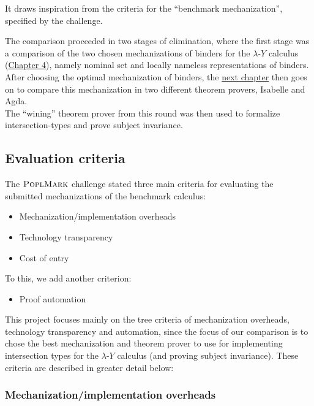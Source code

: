 \documentclass[a4paper, 12pt, twoside]{style/ociamthesis}
\theoremstyle{plain}
\theoremstyle{definition}
\theoremstyle{remark}
\providecommand{\tightlist}{%
  \setlength{\itemsep}{0pt}\setlength{\parskip}{0pt}}
\newcommand{\lamy}{\lambda\text{-}Y}
\newcommand{\poplm}{\textsc{PoplMark}}
\begin{document}
It draws inspiration from the criteria for the ``benchmark
mechanization'', specified by the challenge.

The comparison proceeded in two stages of elimination, where the first
stage was a comparison of the two chosen mechanizations of binders for
the \(\lamy\) calculus (\protect\hyperlink{comp-isa}{Chapter 4}), namely
nominal set and locally nameless representations of binders.\\
After choosing the optimal mechanization of binders, the
\protect\hyperlink{comp-agda}{next chapter} then goes on to compare this
mechanization in two different theorem provers, Isabelle and Agda.\\
The ``wining'' theorem prover from this round was then used to formalize
intersection-types and prove subject invariance.

\subsection{Evaluation criteria}\label{evaluation-criteria}

The \(\poplm\) challenge stated three main criteria for evaluating the
submitted mechanizations of the benchmark calculus:

\begin{itemize}
\tightlist
\item
  Mechanization/implementation overheads
\item
  Technology transparency
\item
  Cost of entry
\end{itemize}

To this, we add another criterion:

\begin{itemize}
\tightlist
\item
  Proof automation
\end{itemize}

This project focuses mainly on the tree criteria of mechanization
overheads, technology transparency and automation, since the focus of
our comparison is to chose the best mechanization and theorem prover to
use for implementing intersection types for the \(\lamy\) calculus (and
proving subject invariance). These criteria are described in greater
detail below:

\subsubsection{Mechanization/implementation
overheads}\label{mechanizationimplementation-overheads}
\end{document}
